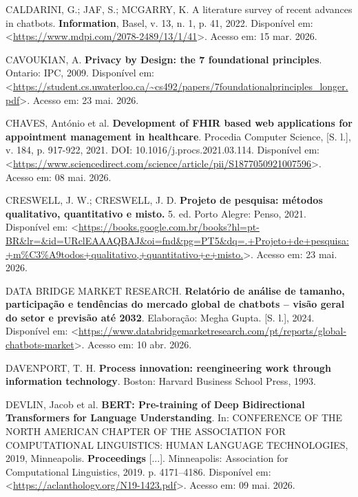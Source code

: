 \documentclass[12pt,a4paper]{extarticle}
\begin{document}
\vspace{0.5cm}\noindent
CALDARINI, G.; JAF, S.; MCGARRY, K. A literature survey of recent advances in chatbots. \textbf{Information}, Basel, v. 13, n. 1, p. 41, 2022. Disponível em: <\url{https://www.mdpi.com/2078-2489/13/1/41}>. Acesso em: 15 mar. 2026.

\vspace{0.5cm}\noindent
CAVOUKIAN, A. \textbf{Privacy by Design: the 7 foundational principles}. Ontario: IPC, 2009. Disponível em: <\url{https://student.cs.uwaterloo.ca/~cs492/papers/7foundationalprinciples_longer.pdf}>. Acesso em: 23 mai. 2026.

\vspace{0.5cm}\noindent
CHAVES, António et al. \textbf{Development of FHIR based web applications for appointment management in healthcare}. Procedia Computer Science, [S. l.], v. 184, p. 917-922, 2021. DOI: 10.1016/j.procs.2021.03.114. Disponível em: <\url{https://www.sciencedirect.com/science/article/pii/S1877050921007596}>. Acesso em: 08 mai. 2026.

\vspace{0.5cm}\noindent
CRESWELL, J. W.; CRESWELL, J. D. \textbf{Projeto de pesquisa: métodos qualitativo, quantitativo e misto.} 5. ed. Porto Alegre: Penso, 2021. Disponível em: <\url{https://books.google.com.br/books?hl=pt-BR&lr=&id=URclEAAAQBAJ&oi=fnd&pg=PT5&dq=.+Projeto+de+pesquisa:+m%C3%A9todos+qualitativo,+quantitativo+e+misto.}>. Acesso em: 23 mai. 2026.

\vspace{0.5cm}\noindent
DATA BRIDGE MARKET RESEARCH. \textbf{Relatório de análise de tamanho, participação e tendências do mercado global de chatbots -- visão geral do setor e previsão até 2032}. Elaboração: Megha Gupta. [S. l.], 2024. Disponível em: <\url{https://www.databridgemarketresearch.com/pt/reports/global-chatbots-market}>. Acesso em: 10 abr. 2026.

\vspace{0.5cm}\noindent
DAVENPORT, T. H. \textbf{Process innovation: reengineering work through information technology}. Boston: Harvard Business School Press, 1993.

\vspace{0.5cm}\noindent
DEVLIN, Jacob et al. \textbf{BERT: Pre-training of Deep Bidirectional Transformers for Language Understanding}. In: CONFERENCE OF THE NORTH AMERICAN CHAPTER OF THE ASSOCIATION FOR COMPUTATIONAL LINGUISTICS: HUMAN LANGUAGE TECHNOLOGIES, 2019, Minneapolis. \textbf{Proceedings} [...]. Minneapolis: Association for Computational Linguistics, 2019. p. 4171--4186. Disponível em: <\url{https://aclanthology.org/N19-1423.pdf}>. Acesso em: 09 mai. 2026.
\end{document}
